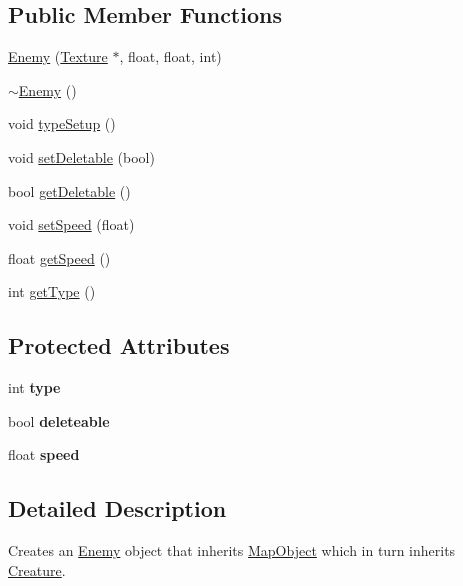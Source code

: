 \subsection*{Public Member Functions}
\begin{DoxyCompactItemize}
\item 
\hyperlink{class_enemy_ae9cfc9f39bd776aaf87eee7346945dd4}{Enemy} (\hyperlink{class_texture}{Texture} $\ast$, float, float, int)
\item 
\hyperlink{class_enemy_ac0eec4755e28c02688065f9657150ac3}{$\sim$\+Enemy} ()
\item 
void \hyperlink{class_enemy_ac50fe15406592d81e276826425b3000b}{type\+Setup} ()
\item 
void \hyperlink{class_enemy_a0b3e1631733e464c755767b894ce3ef4}{set\+Deletable} (bool)
\item 
bool \hyperlink{class_enemy_a37e2cff8cfe21a2ce0245bca77fc84e2}{get\+Deletable} ()
\item 
void \hyperlink{class_enemy_a7185349825042de46d16bad7b1c422d6}{set\+Speed} (float)
\item 
float \hyperlink{class_enemy_acd43fc5766bf7ef886691244e1b66566}{get\+Speed} ()
\item 
int \hyperlink{class_enemy_a499c44284150d928f7fdf3a2d6e6e7ee}{get\+Type} ()
\end{DoxyCompactItemize}
\subsection*{Protected Attributes}
\begin{DoxyCompactItemize}
\item 
\hypertarget{class_enemy_a787a7113c7a5b1119ac3945fb1fb2956}{int {\bfseries type}}\label{class_enemy_a787a7113c7a5b1119ac3945fb1fb2956}

\item 
\hypertarget{class_enemy_adcb5629c5c048d9a04125cb1b0c911ef}{bool {\bfseries deleteable}}\label{class_enemy_adcb5629c5c048d9a04125cb1b0c911ef}

\item 
\hypertarget{class_enemy_a98766d083fc49e746a37d0dc69be09e0}{float {\bfseries speed}}\label{class_enemy_a98766d083fc49e746a37d0dc69be09e0}

\end{DoxyCompactItemize}


\subsection{Detailed Description}
Creates an \hyperlink{class_enemy}{Enemy} object that inherits \hyperlink{class_map_object}{Map\+Object} which in turn inherits \hyperlink{class_creature}{Creature}. 

